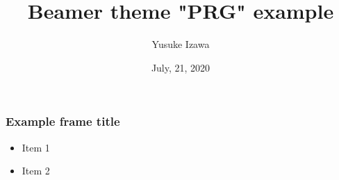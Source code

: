 \documentclass{beamer}
\title{Beamer theme "PRG" example}
\author{Yusuke Izawa}
\date{July, 21, 2020}
\begin{document}
\frame{\maketitle}

\begin{frame}[fragile]
  \frametitle{Example frame title}

  \begin{itemize}
    \item Item 1
    \item Item 2
  \end{itemize}
\end{frame}
\end{document}
